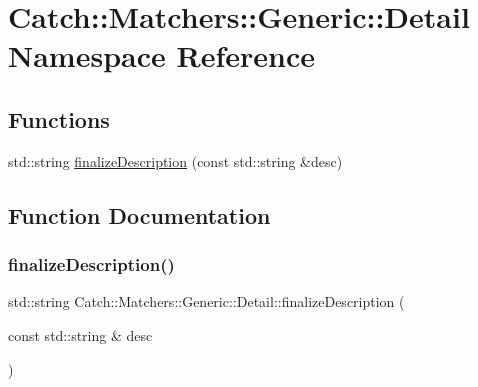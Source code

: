 \hypertarget{namespace_catch_1_1_matchers_1_1_generic_1_1_detail}{}\section{Catch\+:\+:Matchers\+:\+:Generic\+:\+:Detail Namespace Reference}
\label{namespace_catch_1_1_matchers_1_1_generic_1_1_detail}
\subsection*{Functions}
\begin{DoxyCompactItemize}
\item 
std\+::string \mbox{\hyperlink{namespace_catch_1_1_matchers_1_1_generic_1_1_detail_a79ef1103073f7a8d31735436d2012835}{finalize\+Description}} (const std\+::string \&desc)
\end{DoxyCompactItemize}


\subsection{Function Documentation}
\mbox{\label{namespace_catch_1_1_matchers_1_1_generic_1_1_detail_a79ef1103073f7a8d31735436d2012835}} 
\subsubsection{\texorpdfstring{finalize\+Description()}{finalizeDescription()}}
{\footnotesize\ttfamily std\+::string Catch\+::\+Matchers\+::\+Generic\+::\+Detail\+::finalize\+Description (\begin{DoxyParamCaption}\item[{const std\+::string \&}]{desc }\end{DoxyParamCaption})}

